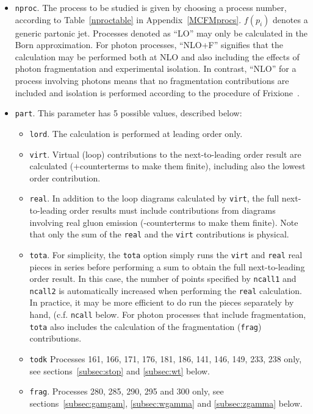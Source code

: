 \documentclass[12pt]{article}
\begin{document}
\begin{itemize}
\item {\tt nproc}.
The process to be studied is given by
choosing a process number, according to Table~\ref{nproctable}
in Appendix~\ref{MCFMprocs}.
$f(p_i)$ denotes a generic partonic jet. Processes denoted as
``LO'' may only be calculated in the Born approximation. For photon
processes, ``NLO+F'' signifies that the calculation may be performed
both at NLO and also including the effects of photon fragmentation
and experimental isolation. In contrast, ``NLO'' for a process involving
photons means that no fragmentation contributions are included and isolation
is performed according to the procedure of Frixione~\cite{Frixione:1998jh}.
\item {\tt part}.
This parameter has 5 possible values, described below:
\begin{itemize}
\item {\tt lord}.
The calculation is performed at leading order only.
\item {\tt virt}.
Virtual (loop) contributions to the next-to-leading order result are
calculated (+counterterms to make them finite), including also the
lowest order contribution.
\item {\tt real}.
In addition to the loop diagrams calculated by {\tt virt}, the full
next-to-leading order results must include contributions from diagrams
involving real gluon emission (-counterterms to make them finite).
Note that only the sum of the {\tt real} and the {\tt virt} contributions
is physical.
\item {\tt tota}.
For simplicity, the {\tt tota} option simply runs the {\tt virt} and
{\tt real} real pieces in series before performing a sum to obtain
the full next-to-leading order result. In this case, the number of
points specified by {\tt ncall1} and {\tt ncall2} is automatically
increased when performing the {\tt real} calculation. In practice,
it may be more efficient to do run the pieces separately by hand, 
(c.f. {\tt ncall} below. For photon processes that include fragmentation,
{\tt tota} also includes the calculation of the fragmentation ({\tt frag})
contributions.
\item {\tt todk}
Processes 161, 166, 171, 176, 181, 186, 141, 146, 149, 233, 238 only, see sections~\ref{subsec:stop} and
\ref{subsec:wt} below.
\item {\tt frag}.
Processes 280, 285, 290, 295 and 300 only, see sections~\ref{subsec:gamgam}, \ref{subsec:wgamma} and
\ref{subsec:zgamma} below.

\end{itemize}


\end{itemize}
\end{document}
